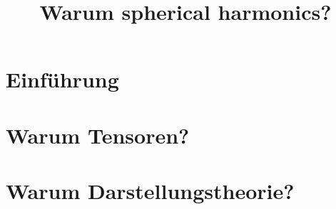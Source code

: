 \documentclass[fontsize=11pt,fleqn,a4paper]{scrartcl}
\author{Johannes Hahn {\and} Andrea Hanke}
\title{Warum spherical harmonics?}
\begin{document}
\maketitle

\tableofcontents

\setcounter{section}{-1}
\section{Einführung}

%
\section{Warum Tensoren?}



\section{Warum Darstellungstheorie?}


\end{document}
